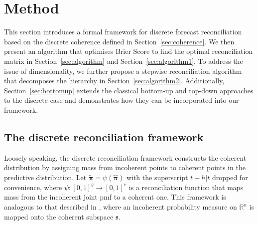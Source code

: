 \documentclass[a4paper,review,12pt,authoryear]{elsarticle}
\newcommand{\bpi}{\bm{\pi}}
\theoremstyle{definition}
\begin{document}
\section{Method}
\label{sec:method}

This section introduces a formal framework for discrete forecast reconciliation based on the discrete coherence defined in Section~\ref{sec:coherence}.
We then present an algorithm that optimises Brier Score to find the optimal reconciliation matrix in Section~\ref{sec:algorithm} and Section~\ref{sec:algorithm1}.
To address the issue of dimensionality, we further propose a stepwise reconciliation algorithm that decomposes the hierarchy in Section~\ref{sec:algorithm2}.
Additionally, Section~\ref{sec:bottomup} extends the classical bottom-up and top-down approaches to the discrete case and demonstrates how they can be incorporated into our framework.

    \subsection{The discrete reconciliation framework}

    Loosely speaking, the discrete reconciliation framework constructs the coherent distribution by assigning mass from incoherent points to coherent points in the predictive distribution.
    Let $\tilde{\bpi} = \psi(\hat{\bpi})$ with the superscript $t+h|t$ dropped for convenience, where $\psi:[0,1]^q \rightarrow [0,1]^r$ is a reconciliation function that maps mass from the incoherent joint pmf to a coherent one.
    This framework is analogous to that described in \cite{panagiotelisProbabilisticForecastReconciliation2022}, where an incoherent probability measure on $\mathbb{R}^n$ is mapped onto the coherent subspace $\mathfrak{s}$.
\end{document}
